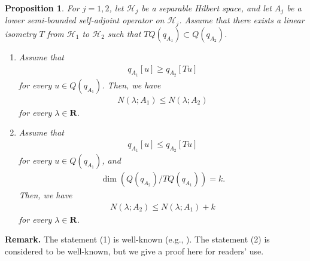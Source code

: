 \documentclass[12pt,a4paper]{article}
\newtheorem{proposition}[theorem]{Proposition}
\begin{document}
\begin{proposition}
 \label{proposition_comparing}
For $j=1,2$, let $\mathcal{H}_j$ be a separable Hilbert space,
and let $A_j$ be a lower semi-bounded self-adjoint operator on $\mathcal{H}_j$.
Assume that there exists a linear isometry $T$ 
from $\mathcal{H}_1$ to $\mathcal{H}_2$  such that 
$T Q(q_{A_1})\subset Q(q_{A_2})$.
\begin{enumerate}
 \item[(1)]
Assume that
\begin{align*}
 q_{A_1}[u] \geq q_{A_2}[Tu]
\end{align*}
for every $u\in Q(q_{A_1})$.
Then, we have
\begin{align}
 N(\lambda;A_1) \leq  N(\lambda;A_2)
\label{06_06}
\end{align}
for every $\lambda\in \mathbf{R}$.
 \item[(2)]
Assume that
\begin{align*}
 q_{A_1}[u] \leq q_{A_2}[Tu]
\end{align*}
for every $u\in Q(q_{A_1})$, and
\begin{align}
\label{06_07}
 \dim(Q(q_{A_2})/TQ(q_{A_1}))=k.
\end{align}
Then, we have
\begin{align}
 N(\lambda;A_2) \leq  N(\lambda;A_1)+k
\label{06_08}
\end{align}
for every $\lambda\in \mathbf{R}$.
\end{enumerate}
\end{proposition}
\noindent\textbf{Remark.}
The statement (1) is well-known (e.g., \cite[Lemme 5.1]{Co}).
The statement (2) is considered to be well-known,
but we give a proof here for readers' use.
\end{document}
